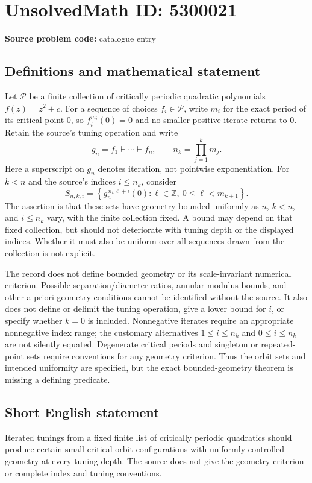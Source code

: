 \documentclass[11pt]{article}
\newcommand{\Z}{\mathbb{Z}}
\begin{document}
\section*{UnsolvedMath ID: 5300021}
\textbf{Source problem code:} catalogue entry
\subsection{Definitions and mathematical statement}
Let $\mathcal P$ be a finite collection of critically periodic quadratic polynomials $f(z)=z^2+c$. For a sequence of choices $f_i\in\mathcal P$, write $m_i$ for the exact period of its critical point $0$, so $f_i^{m_i}(0)=0$ and no smaller positive iterate returns to $0$. Retain the source's tuning operation and write
\[
g_n=f_1\vdash\cdots\vdash f_n,\qquad
n_k=\prod_{j=1}^k m_j.
\]
Here a superscript on $g_n$ denotes iteration, not pointwise exponentiation. For $k<n$ and the source's indices $i\leq n_k$, consider
\[
S_{n,k,i}=\left\{g_n^{\,n_k\ell+i}(0):\ell\in\Z,\ 0\leq\ell<m_{k+1}\right\}.
\]
The assertion is that these sets have geometry bounded uniformly as $n$, $k<n$, and $i\leq n_k$ vary, with the finite collection fixed. A bound may depend on that fixed collection, but should not deteriorate with tuning depth or the displayed indices. Whether it must also be uniform over all sequences drawn from the collection is not explicit.

The record does not define bounded geometry or its scale-invariant numerical criterion. Possible separation/diameter ratios, annular-modulus bounds, and other a priori geometry conditions cannot be identified without the source. It also does not define or delimit the tuning operation, give a lower bound for $i$, or specify whether $k=0$ is included. Nonnegative iterates require an appropriate nonnegative index range; the customary alternatives $1\leq i\leq n_k$ and $0\leq i\leq n_k$ are not silently equated. Degenerate critical periods and singleton or repeated-point sets require conventions for any geometry criterion. Thus the orbit sets and intended uniformity are specified, but the exact bounded-geometry theorem is missing a defining predicate.
\subsection{Short English statement}
Iterated tunings from a fixed finite list of critically periodic quadratics should produce certain small critical-orbit configurations with uniformly controlled geometry at every tuning depth. The source does not give the geometry criterion or complete index and tuning conventions.
\end{document}
